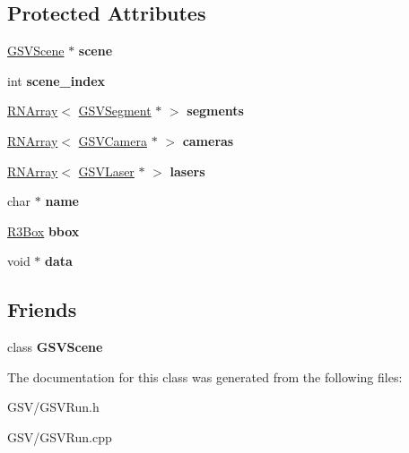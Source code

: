 \subsection*{Protected Attributes}
\begin{DoxyCompactItemize}
\item 
\hyperlink{class_g_s_v_scene}{G\+S\+V\+Scene} $\ast$ {\bfseries scene}\hypertarget{class_g_s_v_run_ae49b8e5233f1f3ff1532957eaef72024}{}\label{class_g_s_v_run_ae49b8e5233f1f3ff1532957eaef72024}

\item 
int {\bfseries scene\+\_\+index}\hypertarget{class_g_s_v_run_af7ea15b9392ac286bf78475a712f9140}{}\label{class_g_s_v_run_af7ea15b9392ac286bf78475a712f9140}

\item 
\hyperlink{class_r_n_array}{R\+N\+Array}$<$ \hyperlink{class_g_s_v_segment}{G\+S\+V\+Segment} $\ast$ $>$ {\bfseries segments}\hypertarget{class_g_s_v_run_a0e3904f3d02e45eaa424c8460bef3a03}{}\label{class_g_s_v_run_a0e3904f3d02e45eaa424c8460bef3a03}

\item 
\hyperlink{class_r_n_array}{R\+N\+Array}$<$ \hyperlink{class_g_s_v_camera}{G\+S\+V\+Camera} $\ast$ $>$ {\bfseries cameras}\hypertarget{class_g_s_v_run_af0323e1574bd4de6f300881253633611}{}\label{class_g_s_v_run_af0323e1574bd4de6f300881253633611}

\item 
\hyperlink{class_r_n_array}{R\+N\+Array}$<$ \hyperlink{class_g_s_v_laser}{G\+S\+V\+Laser} $\ast$ $>$ {\bfseries lasers}\hypertarget{class_g_s_v_run_a0aa106a925363d6d7450a3e3599e72cf}{}\label{class_g_s_v_run_a0aa106a925363d6d7450a3e3599e72cf}

\item 
char $\ast$ {\bfseries name}\hypertarget{class_g_s_v_run_a4d5f11f4beb481a2809d30ab8d1940d2}{}\label{class_g_s_v_run_a4d5f11f4beb481a2809d30ab8d1940d2}

\item 
\hyperlink{class_r3_box}{R3\+Box} {\bfseries bbox}\hypertarget{class_g_s_v_run_afadae3a9c28416931ddc25198454d829}{}\label{class_g_s_v_run_afadae3a9c28416931ddc25198454d829}

\item 
void $\ast$ {\bfseries data}\hypertarget{class_g_s_v_run_aae184890c4f3a0f9985e03eb6b3e4e5c}{}\label{class_g_s_v_run_aae184890c4f3a0f9985e03eb6b3e4e5c}

\end{DoxyCompactItemize}
\subsection*{Friends}
\begin{DoxyCompactItemize}
\item 
class {\bfseries G\+S\+V\+Scene}\hypertarget{class_g_s_v_run_a8abeebefd304625ce456ea1012bf4580}{}\label{class_g_s_v_run_a8abeebefd304625ce456ea1012bf4580}

\end{DoxyCompactItemize}


The documentation for this class was generated from the following files\+:\begin{DoxyCompactItemize}
\item 
G\+S\+V/G\+S\+V\+Run.\+h\item 
G\+S\+V/G\+S\+V\+Run.\+cpp\end{DoxyCompactItemize}
